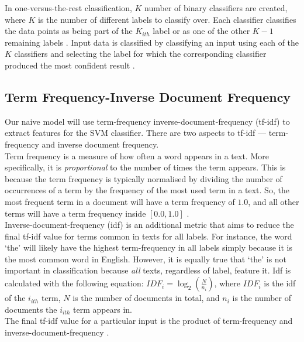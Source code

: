 \noindent
In one-versus-the-rest classification, $K$ number of binary classifiers are created, where $K$ is the number of different labels to classify over. Each classifier classifies the data points as being part of the $K_{ith}$ label or as one of the other $K-1$ remaining labels \cite[p.~182]{BishopChristopherM2006Pram}. Input data is classified by classifying an input using each of the $K$ classifiers and selecting the label for which the corresponding classifier produced the most confident result \cite[p.~338]{BishopChristopherM2006Pram}.\\

\subsection{Term Frequency-Inverse Document Frequency}
\label{tf-idf}

Our naive model will use term-frequency inverse-document-frequency (tf-idf) to extract features for the SVM classifier. There are two aspects to tf-idf --- term-frequency and inverse document frequency. \\

\noindent
Term frequency is a measure of how often a word appears in a text. More specifically, it is \emph{proportional} to the number of times the term appears. This is because the term frequency is typically normalised by dividing the number of occurrences of a term by the frequency of the most used term in a text. So, the most frequent term in a document will have a term frequency of $1.0$, and all other terms will have a term frequency inside $\left[0.0, 1.0\right]$ \cite[p.~8]{leskovec_rajaraman_ullman_2014}. \\

\noindent
Inverse-document-frequency (idf) is an additional metric that aims to reduce the final tf-idf value for terms common in texts for all labels. For instance, the word `the' will likely have the highest term-frequency in all labels simply because it is the most common word in English. However, it is equally true that `the' is not important in classification because \emph{all} texts, regardless of label, feature it. Idf is calculated with the following equation: $ IDF_{i} = \log_{2}\left(\frac{N}{n_{i}}\right)$, where $IDF_{i}$ is the idf of the $i_{ith}$ term, $N$ is the number of documents in total, and $n_{i}$ is the number of documents the $i_{ith}$ term appears in. \\

\noindent
The final tf-idf value for a particular input is the product of term-frequency and inverse-document-frequency \cite[p.~8]{leskovec_rajaraman_ullman_2014}.

